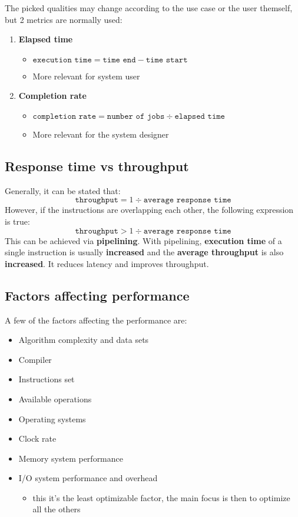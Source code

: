 \documentclass[english]{article}
\begin{document}
The picked qualities may change according to the use case or the user themself,
but 2 metrics are normally used:

\begin{enumerate}
  \item \textbf{Elapsed time}
        \begin{itemize}
          \item \(\texttt{execution time} = \texttt{time end} - \texttt{time start}\)
          \item More relevant for system user
        \end{itemize}
  \item \textbf{Completion rate}
        \begin{itemize}
          \item \(\texttt{completion rate} = \texttt{number of jobs} \div \texttt{elapsed time}\)
          \item More relevant for the system designer
        \end{itemize}
\end{enumerate}

\subsection{Response time vs throughput}

Generally, it can be stated that:
\[ \texttt{throughput} = {1} \div { \texttt{average response time}} \]
However, if the instructions are overlapping each other, the following expression is true:
\[ \texttt{throughput} > {1} \div {\texttt{average response time}} \]
This can be achieved via \textbf{pipelining}.
With pipelining, \textbf{execution time} of a single instruction is usually \textbf{increased} and  the \textbf{average throughput} is also \textbf{increased}. It reduces latency and improves throughput.

\subsection{Factors affecting performance}

A few of the factors affecting the performance are:

\begin{itemize}
  \item Algorithm complexity and data sets
  \item Compiler
  \item Instructions set
  \item Available operations
  \item Operating systems
  \item Clock rate
  \item Memory system performance
  \item I/O system performance and overhead
        \begin{itemize}
          \item this it's the least optimizable factor, the main focus is then to optimize all the others
        \end{itemize}
\end{itemize}
\end{document}

